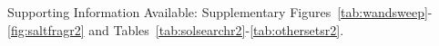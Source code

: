 \documentclass[journal=jmcmar,manuscript=article]{achemso}
\begin{document}
\begin{suppinfo}

Supporting Information Available: Supplementary Figures~\ref{tab:wandsweep}-\ref{fig:saltfragr2} and Tables~\ref{tab:solsearchr2}-\ref{tab:othersetsr2}.
\end{suppinfo}


\end{document}
